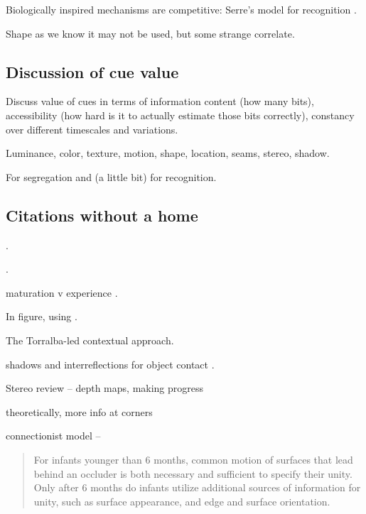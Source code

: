 Biologically inspired mechanisms are competitive:
Serre's model for recognition \cite{serre05object}.

Shape as we know it may not be used, but some strange 
correlate.



\subsection{Discussion of cue value}

Discuss value of cues in terms of information content (how many bits),
accessibility (how hard is it to actually estimate those bits
correctly), constancy over different timescales and variations.

Luminance, color, texture, motion, shape, location, seams, stereo,
shadow.

For segregation and (a little bit) for recognition.


\subsection{Citations without a home}

\cite{swain91color}.

\cite{schiele00recognition}.

\cite{lowe04distinctive}

\cite{felzenszwalb04efficient}

maturation v experience \cite{quinn05learning}.

In figure, using \cite{felzenszwalb04efficient}.

\cite{gibson88exploratory}

\cite{spelke90principles}

\cite{martin01database}

The Torralba-led contextual approach.


shadows and interreflections for object contact
\cite{madison01use}.


Stereo review -- depth maps, making progress
\cite{scharstein02taxonomy}

theoretically, more info at corners \cite{feldman05information}

connectionist model
\cite{mareschal02learning} --

\begin{quote}

For infants younger than 6 months, common motion of surfaces that lead
behind an occluder is both necessary and sufficient to specify their
unity. Only after 6 months do infants utilize additional sources of
information for unity, such as surface appearance, and edge and
surface orientation. \cite{mareschal02learning}

\end{quote}


